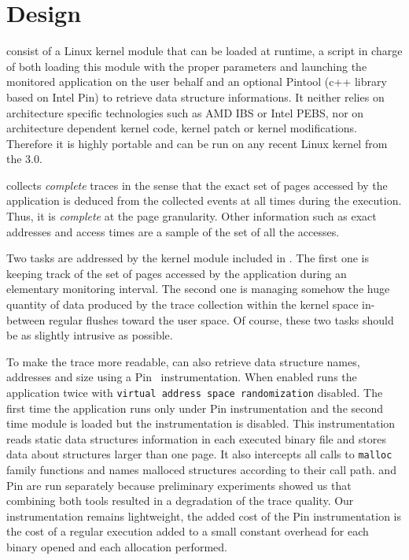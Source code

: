 \section{Design}
\label{sec:design}

\Moca consist of a Linux kernel module that can be loaded at runtime,  a script
in charge of both loading this module with the proper parameters and launching the
monitored application on the user behalf
and an optional Pintool (c++ library based on Intel Pin) to retrieve data
structure informations.
It neither relies on architecture specific
technologies such as AMD IBS or Intel PEBS, nor on architecture dependent kernel
code, kernel patch or kernel modifications.
Therefore it is highly portable and can be run on any recent Linux kernel
from the $3.0$.

\Moca collects \emph{complete} traces in the sense that the exact set
of pages accessed by the application is deduced from the collected events
at all times during the execution. Thus, it is \emph{complete} at the page granularity.
Other information such as exact addresses and access times are a sample of
the set of all the accesses.

Two tasks are addressed by the kernel module included in \Moca. The first one is
keeping track of the set of pages accessed by the application during an elementary monitoring
interval. The second one is managing somehow the huge quantity of data produced
by the trace collection within the kernel space in-between regular flushes toward
the user space. Of course, these two tasks should be as slightly intrusive as possible.

To make the trace more readable, \Moca can also retrieve data structure
names, addresses and size using a Pin~\cite{Luk05Pin}
instrumentation. When enabled \Moca runs the application twice with \texttt{virtual
address space randomization} disabled. The first time the application runs only
under Pin instrumentation and the second time \Moca module is loaded but the
instrumentation is disabled. This instrumentation reads static data
structures information in each executed binary file and stores data about structures larger than
one page. It also intercepts all calls to \texttt{malloc} family functions
and names malloced structures according to their call path.
\Moca and Pin are run separately because preliminary experiments showed us that combining both
tools resulted in a degradation of the trace quality. Our instrumentation remains lightweight, the
added cost of the Pin instrumentation is the cost of a regular execution 
added to a small constant overhead for each binary opened and each allocation performed.

